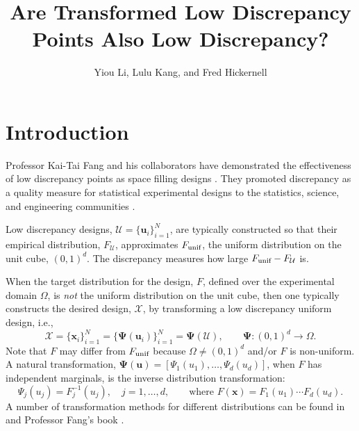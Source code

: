 \documentclass[graybox]{svmult}
\newcommand{\vx}{\boldsymbol{x}}
\newcommand{\vu}{\boldsymbol{u}}
\newcommand{\vPsi}{\boldsymbol{\Psi}}
\newcommand{\Udes}{\mathcal{U}}
\newcommand{\Xdes}{\mathcal{X}}
\newcommand{\Ftar}{F}
\newcommand{\cube}{\ensuremath{(0,1)^d}}
\newcommand{\unif}{\textup{unif}}
\begin{document}
\title*{Are Transformed Low Discrepancy Points Also Low Discrepancy?}
\author{Yiou Li, Lulu Kang, and Fred Hickernell}
%
%
\maketitle


\section{Introduction}

Professor Kai-Tai Fang and his collaborators have demonstrated the effectiveness of low discrepancy points as space filling designs \cite{FanWan94, FanLiSud06, FangHic07a}.  
They promoted discrepancy as a quality measure for statistical experimental designs to the statistics, science, and engineering communities \cite{FanMaWin02, FanMuk00, FanMa01a, FanMa01b}. 

Low discrepancy designs, $\Udes = \{\vu_i\}_{i=1}^N$, are typically constructed so that their empirical distribution, $F_\Udes$, approximates $F_\unif$, the uniform distribution on the unit cube, \cube.  
The discrepancy measures how large $F_\unif-F_\Udes$ is.  

When the target distribution for the design, $\Ftar$, defined over the experimental domain $\Omega$, is \emph{not} the uniform distribution on the unit cube, then one typically constructs the desired design, $\Xdes$, by transforming a low discrepancy uniform design, i.e., 
\begin{equation} \label{eq:transPts}
\Xdes = \{\vx_i\}_{i=1}^N = \{\vPsi(\vu_i)\}_{i=1}^N = \vPsi(\Udes), \qquad \vPsi: \cube \to \Omega.
\end{equation}
Note that $\Ftar$ may differ from $F_\unif$ because $\Omega \ne \cube$ and/or $\Ftar$ is non-uniform.  
A natural transformation, $\vPsi(\vu)=[\Psi_1(u_1),\ldots,\Psi_d(u_d)]$, when $\Ftar$ has independent marginals, is the inverse distribution transformation:
\begin{equation}\label{eq:inverse}
\Psi_j(u_j) = F_j^{-1}(u_j), \quad j =1, \ldots, d, \qquad \text{where } \Ftar(\vx) = F_1(u_1) \cdots F_d(u_d).
\end{equation}
A number of transformation methods for different distributions can be found in \cite{devroye2006nonuniform} and Professor Fang's book \cite{FanWan94}.
\end{document}

